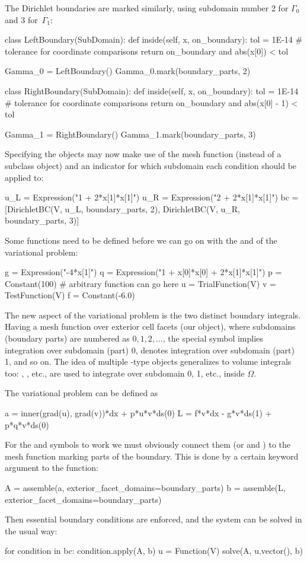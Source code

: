 The Dirichlet boundaries are marked similarly, using subdomain number
2 for $\Gamma_0$ and 3 for~$\Gamma_1$:
\begin{python}
class LeftBoundary(SubDomain):
    def inside(self, x, on_boundary):
        tol = 1E-14   # tolerance for coordinate comparisons
        return on_boundary and abs(x[0]) < tol

Gamma_0 = LeftBoundary()
Gamma_0.mark(boundary_parts, 2)

class RightBoundary(SubDomain):
    def inside(self, x, on_boundary):
        tol = 1E-14   # tolerance for coordinate comparisons
        return on_boundary and abs(x[0] - 1) < tol

Gamma_1 = RightBoundary()
Gamma_1.mark(boundary_parts, 3)
\end{python}
Specifying the  objects may now make use of the mesh
function (instead of a  subclass object) and an indicator
for which subdomain each condition should be applied to:
\begin{python}
u_L = Expression("1 + 2*x[1]*x[1]")
u_R = Expression("2 + 2*x[1]*x[1]")
bc = [DirichletBC(V, u_L, boundary_parts, 2),
      DirichletBC(V, u_R, boundary_parts, 3)]
\end{python}

Some functions need to be defined before we can go on with the 
and  of the variational problem:
\begin{python}
g = Expression("-4*x[1]")
q = Expression("1 + x[0]*x[0] + 2*x[1]*x[1]")
p = Constant(100)  # arbitrary function can go here
u = TrialFunction(V)
v = TestFunction(V)
f = Constant(-6.0)
\end{python}

The new aspect of the variational problem is the two distinct boundary
integrals.  Having a mesh function over exterior cell facets (our
 object), where subdomains (boundary parts) are
numbered as $0,1,2,\ldots$, the special symbol  implies
integration over subdomain (part) 0,  denotes integration
over subdomain (part) 1, and so on.  The idea of multiple -type
objects generalizes to volume integrals too: , ,
etc., are used to integrate over subdomain 0, 1, etc., inside $\Omega$.

The variational problem can be defined as
\begin{python}
a = inner(grad(u), grad(v))*dx + p*u*v*ds(0)
L = f*v*dx - g*v*ds(1) + p*q*v*ds(0)
\end{python}
For the  and  symbols to work we must obviously
connect them (or  and ) to the mesh function marking
parts of the boundary. This is done by a certain keyword argument to
the  function:
\begin{python}
A = assemble(a, exterior_facet_domains=boundary_parts)
b = assemble(L, exterior_facet_domains=boundary_parts)
\end{python}
Then essential boundary conditions are enforced, and the system can be
solved in the usual way:
\begin{python}
for condition in bc: condition.apply(A, b)
u = Function(V)
solve(A, u.vector(), b)
\end{python}

